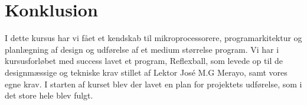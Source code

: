 \section{Konklusion}
I dette kursus har vi fået et kendskab til mikroprocessorere, programarkitektur og planlægning af design og udførelse af et medium størrelse program. Vi har i kursusforløbet med success lavet et program, Reflexball, som levede op til de designmæssige og tekniske krav  stillet af Lektor José M.G Merayo, samt vores egne krav. I starten af kurset blev der lavet en plan for projektets udførelse, som i det store hele blev fulgt. 